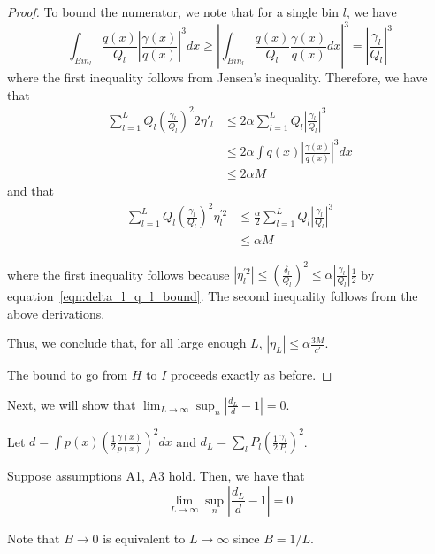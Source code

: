 \documentclass{article}
\begin{document}
\begin{proof}
To bound the numerator, we note that for a single bin $l$, we have
\[
\int_{Bin_l} \frac{q(x)}{Q_l} \left| \frac{\gamma(x)}{q(x)} \right|^3 dx \geq
 \left| \int_{Bin_l} \frac{q(x)}{Q_l} \frac{\gamma(x)}{q(x)} dx \right|^3 =
 \left| \frac{\gamma_l}{Q_l} \right|^3
\]
where the first inequality follows from Jensen's inequality. Therefore, we have that
\begin{align*}
\sum_{l=1}^L Q_l \left( \frac{\gamma_l}{Q_l} \right)^2 2 \eta'_l &\leq
   2 \alpha \sum_{l=1}^L Q_l \left| \frac{\gamma_l}{Q_l} \right|^3 \\
 &\leq 2 \alpha \int q(x) \left| \frac{\gamma(x)}{q(x)} \right|^3 dx \\
 &\leq 2 \alpha M
\end{align*}
and that
\begin{align*}
\sum_{l=1}^L Q_l \left( \frac{\gamma_l}{Q_l} \right)^2 \eta^{\prime 2}_l &\leq
 \frac{\alpha}{2}  \sum_{l=1}^L Q_l \left| \frac{\gamma_l}{Q_l} \right|^3  \\
  &\leq \alpha M
\end{align*}

where the first inequality follows because $|\eta^{\prime 2}_l| \leq \left( \frac{\delta_l}{Q_l} \right)^2 \leq \alpha \left| \frac{\gamma_l}{Q_l} \right| \frac{1}{2}$ by equation~\ref{eqn:delta_l_q_l_bound}. The second inequality follows from the above derivations.

Thus, we conclude that, for all large enough $L$, $|\eta_L| \leq \alpha \frac{3M}{c'}$. 

The bound to go from $H$ to $I$ proceeds exactly as before.
\end{proof}



Next, we will show that $\lim_{L \rightarrow \infty} \sup_n \left| \frac{d_L}{d} - 1 \right| = 0$. 

\begin{proposition}
\label{prop:convergence_discrete_continuous_renyi}

Let $d = \int p(x) \left( \frac{1}{2} \frac{\gamma(x)}{p(x)} \right)^2 dx$ and $d_L = \sum_l P_l \left( \frac{1}{2} \frac{\gamma_l}{P_l} \right)^2$. 

Suppose assumptions A1, A3 hold. Then, we have that
\[
\lim_{L \rightarrow \infty} \sup_n \left| \frac{d_L}{d} - 1 \right| = 0
\]

\end{proposition}


Note that $B \rightarrow 0$ is equivalent to $L \rightarrow \infty$ since $B = 1/L$. 
\end{document}
